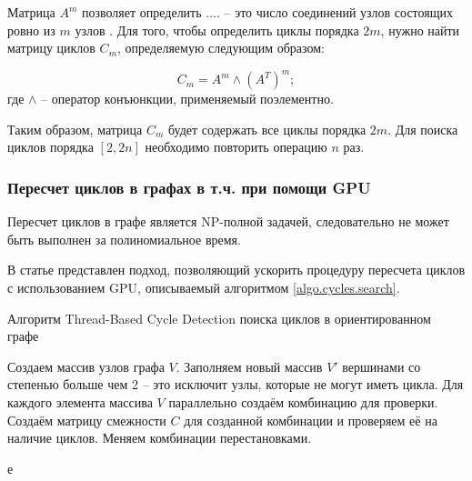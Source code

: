 Матрица $A^m$ позволяет определить .... -- это число соединений узлов состоящих ровно из $m$ узлов \cite{davidrajuh2016}. Для того, чтобы определить циклы порядка $2m$, нужно найти матрицу циклов $C_m$, определяемую следующим образом: %

\begin{equation}\label{eq.rndhpcedt.2021.11.14.03}
    C_m = A^m \wedge (A^T)^m;
\end{equation}
где $\wedge$ -- оператор конъюнкции, применяемый поэлементно.

Таким образом, матрица $C_m$ будет содержать все циклы порядка $2m$. Для поиска циклов порядка $[2, 2n]$ необходимо повторить операцию $n$ раз.

\subsubsection{Пересчет циклов в графах в т.ч. при помощи GPU}

\begin{remark}
Пересчет циклов в графе является NP-полной задачей\cite{Mahdi2011}, следовательно не может быть выполнен за полиномиальное время.
\end{remark}

В статье \cite{Mahdi2011} представлен подход, позволяющий ускорить процедуру пересчета циклов с использованием \textsf{GPU}, описываемый алгоритмом \ref{algo.cycles.search}.

\begin{algorithm}[H]
\caption{Алгоритм Thread-Based Cycle Detection поиска циклов в ориентированном графе}\label{algo.cycles.search}
\begin{algorithmic}[1]
	\State Создаем массив узлов графа $V$.
	\State Заполняем новый массив $V'$ вершинами со степенью больше чем 2 -- это исключит узлы, которые не могут иметь цикла. 
	\State Для каждого элемента массива $V$ параллельно создаём комбинацию для проверки.
	\State Создаём матрицу смежности $C$ для созданной комбинации и проверяем её на наличие циклов.
	\State Меняем комбинации перестановками.
\end{algorithmic}
\end{algorithm}

е\noteattributes{}
